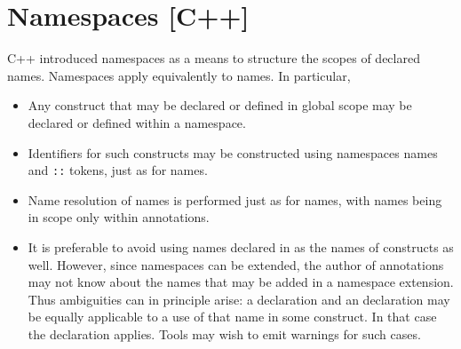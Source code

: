 \section{Namespaces [C++]}
\label{sec:namespaces}

C++ introduced namespaces as a means to structure the scopes of declared names. Namespaces apply equivalently to \NAME{} 
names. In particular,
\begin{itemize}
\item Any \NAME{} construct that may be declared or defined 
in global scope may be declared or defined within a namespace.
\item Identifiers for such constructs may be constructed using namespaces names and \lstinline|::| tokens, just as for \lang{} names.
\item Name resolution of \NAME{} names is performed just as for \lang{} names, with \NAME{} names being in scope only within \NAME{} annotations.
\item It is preferable to avoid using names declared in \lang{} as the names of \NAME{} constructs as well. However, since namespaces can be extended, the author of \NAME{} annotations may not know about the \lang{} names that may be added in a namespace extension. Thus ambiguities can in
principle arise: a \lang{} declaration and an \NAME{}
declaration may be equally applicable to a use of that name 
in some \NAME{} construct. In that case the \NAME{} declaration applies.
Tools may wish to emit warnings for such cases.

\end{itemize}

